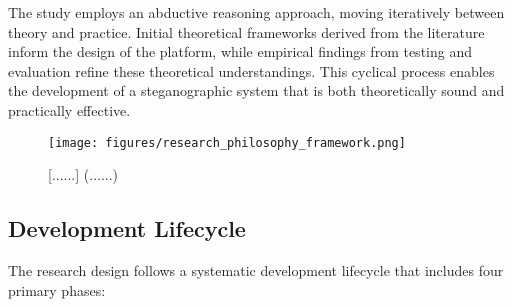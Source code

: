 \documentclass[12pt, a4paper, oneside]{book}
\begin{document}
The study employs an abductive reasoning approach, moving iteratively between theory and practice. Initial theoretical frameworks derived from the literature inform the design of the platform, while empirical findings from testing and evaluation refine these theoretical understandings. This cyclical process enables the development of a steganographic system that is both theoretically sound and practically effective.

\begin{figure}[htbp]
    \centering
    \texttt{[image: figures/research\_philosophy\_framework.png]}
    \caption{[......] (......)}
    \label{fig:research_philosophy}
\end{figure}

\subsection{Development Lifecycle}

The research design follows a systematic development lifecycle that includes four primary phases:
\end{document}
